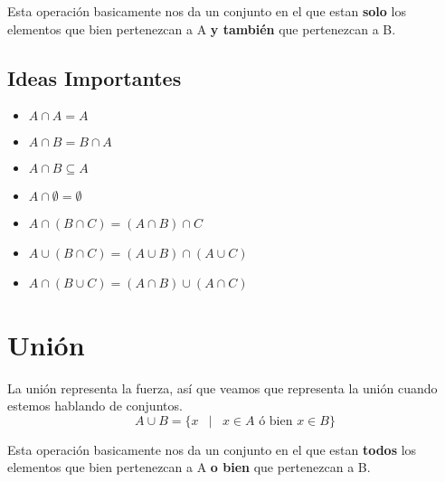 \documentclass[12pt, fleqn]{report}                             %
\DeclareMathOperator \Space {\quad}                             %
\DeclareMathOperator \MiniSpace {\;}                            %
\newcommand \Such {\MiniSpace|\MiniSpace}                       %
\begin{document}
            Esta operación basicamente nos da un conjunto en el que estan \textbf{solo} los elementos
            que bien pertenezcan a A \textbf{y también} que pertenezcan a B.

            \subsection{Ideas Importantes}

                \begin{itemize}
                    \item $A \cap A = A$

                    \item $A \cap B = B \cap A$

                    \item $A \cap B \subseteq A$

                    \item $A \cap \emptyset = \emptyset$

                    \item $A \cap (B \cap C) = (A \cap B) \cap C$

                    \item $A \cup (B \cap C) = (A \cup B) \cap (A \cup C)$

                    \item $A \cap (B \cup C) = (A \cap B) \cup (A \cap C)$
                \end{itemize}


        \clearpage
        \section{Unión}

            La unión representa la fuerza, así que veamos que representa la unión cuando estemos
            hablando de conjuntos.
            \begin{equation*}
                A \cup B = \{ x \Such x \in A \text{ ó bien } x \in B \}
            \end{equation*}

            Esta operación basicamente nos da un conjunto en el que estan \textbf{todos} los elementos
            que bien pertenezcan a A \textbf{o bien} que pertenezcan a B.
\end{document}
